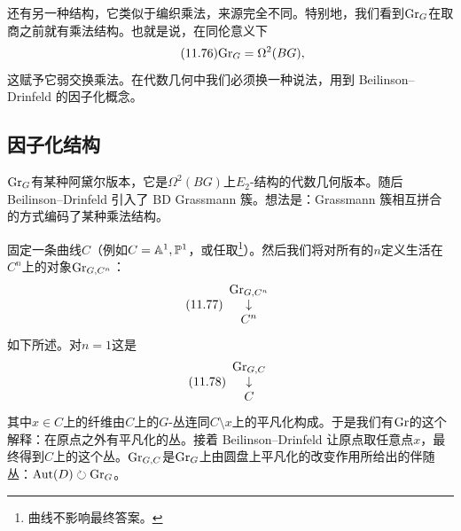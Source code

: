 还有另一种结构，它类似于编织乘法，来源完全不同。特别地，我们看到$\mathrm{Gr}_G$在取商之前就有乘法结构。也就是说，在同伦意义下
\begin{equation}\tag{11.76}
\mathrm{Gr}_G=\Omega^{2}(BG),
\end{equation}
这赋予它弱交换乘法。在代数几何中我们必须换一种说法，用到 Beilinson–Drinfeld 的因子化概念。

\subsection{因子化结构}\label{sec:11-4-1}

$\mathrm{Gr}_G$有某种阿黛尔版本，它是$\Omega^{2}(BG)$上$E_2$-结构的代数几何版本。随后 Beilinson–Drinfeld 引入了 BD Grassmann 簇。想法是：Grassmann 簇相互拼合的方式编码了某种乘法结构。

固定一条曲线$C$（例如$C=\mathbb{A}^1,\mathbb{P}^1$，或任取\footnote{曲线不影响最终答案。}）。然后我们将对所有的$n$定义生活在$C^{n}$上的对象$\mathrm{Gr}_{G,C^{n}}$：
\begin{equation}\tag{11.77}
\begin{array}{ccc}
\mathrm{Gr}_{G,C^{n}} & & \\
\downarrow & & \\
C^{n} & &
\end{array}
\end{equation}
如下所述。对$n=1$这是
\begin{equation}\tag{11.78}
\begin{array}{ccc}
\mathrm{Gr}_{G,C} & & \\
\downarrow & & \\
C & &
\end{array}
\end{equation}
其中$x\in C$上的纤维由$C$上的$G$-丛连同$C\setminus x$上的平凡化构成。于是我们有$\mathrm{Gr}$的这个解释：在原点之外有平凡化的丛。接着 Beilinson–Drinfeld 让原点取任意点$x$，最终得到$C$上的这个丛。$\mathrm{Gr}_{G,C}$是$\mathrm{Gr}_G$上由圆盘上平凡化的改变作用所给出的伴随丛：$\mathrm{Aut}(D)\circlearrowright\mathrm{Gr}_G$。

